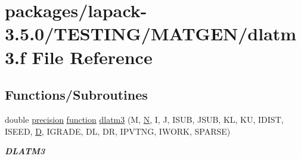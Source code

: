 \hypertarget{dlatm3_8f}{}\section{packages/lapack-\/3.5.0/\+T\+E\+S\+T\+I\+N\+G/\+M\+A\+T\+G\+E\+N/dlatm3.f File Reference}
\label{dlatm3_8f}
\subsection*{Functions/\+Subroutines}
\begin{DoxyCompactItemize}
\item 
double \hyperlink{numinquire_8h_a2c8e616467665d0b2814d4c1589ba74e}{precision} \hyperlink{afunc_8m_a7b5e596df91eadea6c537c0825e894a7}{function} \hyperlink{group__double__matgen_ga2a6e2bb39fef79266ac7a58bf69f2f41}{dlatm3} (M, \hyperlink{polmisc_8c_a0240ac851181b84ac374872dc5434ee4}{N}, I, J, I\+S\+U\+B, J\+S\+U\+B, K\+L, K\+U, I\+D\+I\+S\+T, I\+S\+E\+E\+D, \hyperlink{odrpack_8h_a7dae6ea403d00f3687f24a874e67d139}{D}, I\+G\+R\+A\+D\+E, D\+L, D\+R, I\+P\+V\+T\+N\+G, I\+W\+O\+R\+K, S\+P\+A\+R\+S\+E)
\begin{DoxyCompactList}\small\item\em {\bfseries D\+L\+A\+T\+M3} \end{DoxyCompactList}\end{DoxyCompactItemize}
